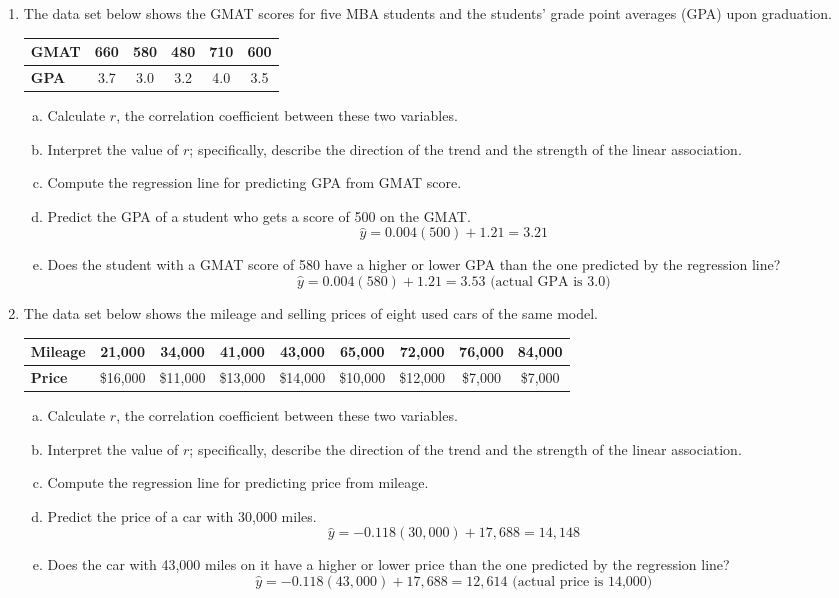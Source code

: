\begin{enumerate}
\item The data set below shows the GMAT scores for five MBA students and the students' grade point averages (GPA) upon graduation.
\begin{center}
\begin{tabular}{l | c c c c c}
\textbf{GMAT} & 660 & 580 & 480 & 710 & 600\\
\hline
\textbf{GPA} & 3.7 & 3.0 & 3.2 & 4.0 & 3.5
\end{tabular}
\end{center}
\begin{enumerate}[(a)]
\item Calculate $r$, the correlation coefficient between these two variables. 
\item Interpret the value of $r$; specifically, describe the direction of the trend and the strength of the linear association. 
\item Compute the regression line for predicting GPA from GMAT score. 
\item Predict the GPA of a student who gets a score of 500 on the GMAT. 
\[\hat{y} = 0.004(500) + 1.21 = 3.21\]
\item Does the student with a GMAT score of 580 have a higher or lower GPA than the one predicted by the regression line? 
\[\hat{y} = 0.004(580) + 1.21 = 3.53 \textrm{ (actual GPA is 3.0)}\]
\end{enumerate}

\item The data set below shows the mileage and selling prices of eight used cars of the same model.
\begin{center}
\begin{tabular}{l | c c c c cc c c}
\textbf{Mileage} & 21,000 & 34,000 & 41,000 & 43,000 & 65,000 & 72,000 & 76,000 & 84,000\\
\hline
\textbf{Price} & \$16,000 & \$11,000 & \$13,000 & \$14,000 & \$10,000 & \$12,000 & \$7,000 & \$7,000
\end{tabular}
\end{center}
\begin{enumerate}[(a)]
\item Calculate $r$, the correlation coefficient between these two variables. 
\item Interpret the value of $r$; specifically, describe the direction of the trend and the strength of the linear association. 
\item Compute the regression line for predicting price from mileage. 
\item Predict the price of a car with 30,000 miles. 
\[\hat{y} = -0.118(30,000) + 17,688 = 14,148\]
\item Does the car with 43,000 miles on it have a higher or lower price than the one predicted by the regression line? 
\[\hat{y} = -0.118(43,000) + 17,688 = 12,614 \textrm{ (actual price is 14,000)}\]
\end{enumerate}
\end{enumerate}